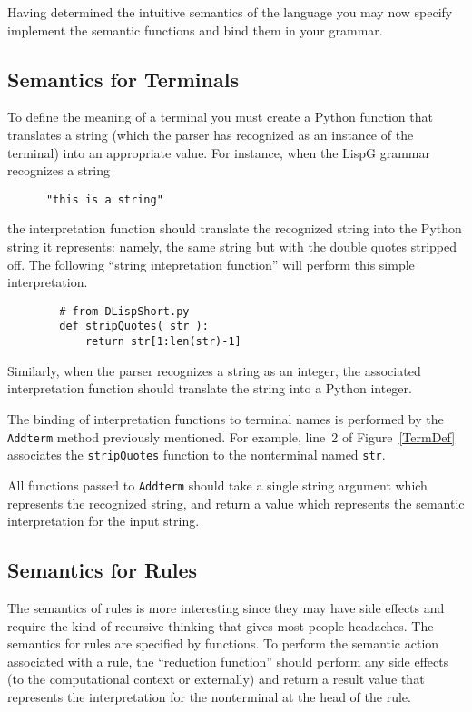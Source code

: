 Having determined the intuitive semantics of the language you
may now specify implement the semantic functions and
bind them in your grammar.

\subsection{Semantics for Terminals}

To define the meaning of a terminal you must create a Python
function that translates a string (which the parser has recognized
as an instance of the terminal)
into an appropriate value.
For instance, when the LispG grammar recognizes a string
\begin{verbatim}
      "this is a string"
\end{verbatim}
the interpretation function should translate the recognized
string into the Python string it represents: namely,
the same string but with the double quotes stripped off.
The following ``string intepretation function'' will perform
this simple interpretation.
\begin{verbatim}
        # from DLispShort.py
        def stripQuotes( str ):
            return str[1:len(str)-1]
\end{verbatim}
Similarly, when the parser recognizes a string as
an integer, the associated interpretation function
should translate the string into a Python integer.

The binding of interpretation functions to terminal
names is performed by the {\tt Addterm} method previously
mentioned.  For example, line~2 of Figure~\ref{TermDef}
associates the {\tt stripQuotes} function to the
nonterminal named {\tt str}.  

All functions passed to
{\tt Addterm} should take a single string argument
which represents the recognized string, and return
a value which represents the semantic interpretation
for the input string.

\subsection{Semantics for Rules}

The semantics of rules is more interesting since they may
have side effects and require the kind of recursive thinking
that gives most people headaches.  The semantics for rules
are specified by functions.  To perform the
semantic action associated with a rule, the ``reduction
function'' should
perform any side effects (to the computational context or
externally) and return a result value that represents
the interpretation for the nonterminal at the head of the rule.

